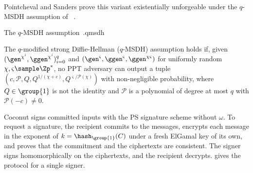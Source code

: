 Pointcheval and Sanders prove this variant existentially unforgeable under the
$q$-MSDH assumption of ~\cite{RSA:PoiSan18}.

\begin{assumptionbox}{The $q$-MSDH assumption~\cite{RSA:PoiSan18}.}{qmsdh}

  The $q$-modified strong Diffie-Hellman ($q$-MSDH) assumption holds if, given $(\gen^{\chi^i},
\ggen^{\chi^i})_{i=0}^{q}$ and $(\gen^{\varsigma}, \ggen^{\varsigma},
\ggen^{\chi\varsigma})$ for uniformly random $\chi, \varsigma \sample \Zp^*$, no
PPT adversary can output a tuple $(c, \mathcal{P}, Q, Q^{1/(\chi+c)},
Q^{\varsigma/\mathcal{P}(\chi)})$ with non-negligible probability, where $Q \in
\group{1}$ is not the identity and $\mathcal{P}$ is a polynomial of degree at most
$q$ with $\mathcal{P}(-c) \neq 0$.

\end{assumptionbox}

Coconut signs committed inputs with the PS signature scheme without
$\omega$. To request a signature, the recipient commits to the messages,
encrypts each message in the exponent of $k = \hash_{\group{1}}(C)$ under a
fresh ElGamal key of its own, and proves that the commitment and the
ciphertexts are consistent. The signer signs homomorphically on the
ciphertexts, and the recipient decrypts.  gives the protocol
for a single signer.

